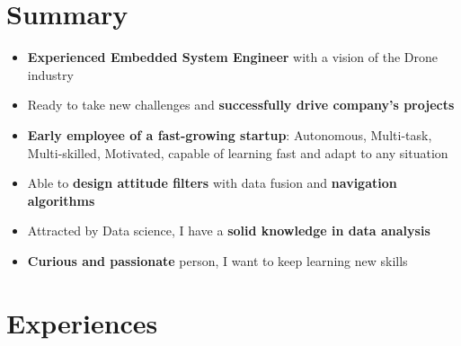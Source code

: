 \documentclass[a4paper]{friggeri-cv} %
\begin{document}
\section{Summary}
\begin{itemize}
\item \textbf{Experienced Embedded System Engineer} with a vision of the Drone industry
\item Ready to take new challenges and \textbf{successfully drive company's projects}%
\item \textbf{Early employee of a fast-growing startup}: Autonomous, Multi-task, Multi-skilled, Motivated, capable of learning fast and adapt to any situation
\item Able to \textbf{design attitude filters} with data fusion and \textbf{navigation algorithms}
\item Attracted by Data science, I have a \textbf{solid knowledge in data analysis}
\item \textbf{Curious and passionate} person, I want to keep learning new skills\\
\end{itemize}



\section{Experiences}
\end{document}
